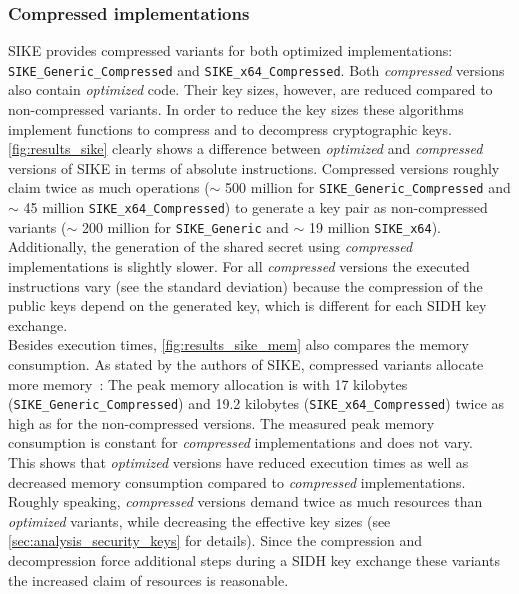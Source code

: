 \subsubsection{Compressed implementations}
\gls{SIKE} provides compressed variants for both optimized implementations:\\ \texttt{SIKE\_Generic\_Compressed} and \texttt{SIKE\_x64\_Compressed}.
Both \textit{compressed} versions also contain \textit{optimized} code. Their key sizes, however, are reduced compared to non-compressed variants. In order to reduce the key sizes these algorithms implement functions to compress and to decompress cryptographic keys.\\
\autoref{fig:results_sike} clearly shows a difference between \textit{optimized} and \textit{compressed} versions of \gls{SIKE} in terms of absolute instructions. Compressed versions roughly claim twice as much operations ($\sim$ 500 million for \texttt{SIKE\_Generic\_Compressed} and $\sim$ 45 million \texttt{SIKE\_x64\_Compressed}) to generate a key pair as non-compressed variants ($\sim$ 200 million for \texttt{SIKE\_Generic} and $\sim$ 19 million \texttt{SIKE\_x64}). Additionally, the generation of the shared secret using \textit{compressed} implementations is slightly slower. For all \textit{compressed} versions the executed instructions vary (see the standard deviation) because the compression of the public keys depend on the generated key, which is different for each \gls{SIDH} key exchange.\\
Besides execution times, \autoref{fig:results_sike_mem} also compares the memory consumption. As stated by the authors of \gls{SIKE}, compressed variants allocate more memory~\parencite{sike2020spec}: The peak memory allocation is with 17 kilobytes (\texttt{SIKE\_Generic\_Compressed}) and 19.2 kilobytes (\texttt{SIKE\_x64\_Compressed}) twice as high as for the non-compressed versions. The measured peak memory consumption is constant for \textit{compressed} implementations and does not vary.\\
This shows that \textit{optimized} versions have reduced execution times as well as decreased memory consumption compared to \textit{compressed} implementations. Roughly speaking, \textit{compressed} versions demand twice as much resources than \textit{optimized} variants, while decreasing the effective key sizes (see \autoref{sec:analysis_security_keys} for details). Since the compression and decompression force additional steps during a \gls{SIDH} key exchange these variants the increased claim of resources is reasonable.



